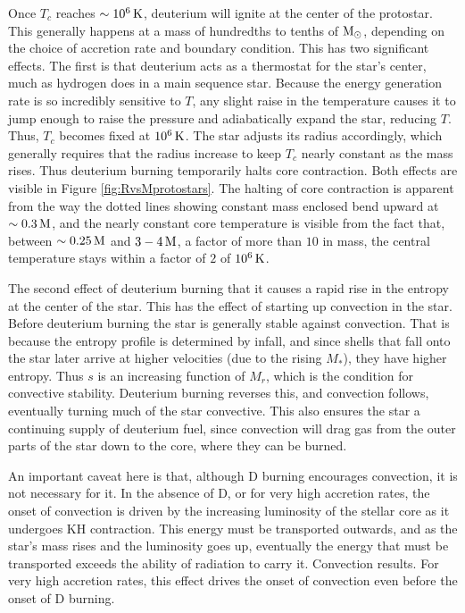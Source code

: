 \documentclass[a4paper,10pt]{article}
\begin{document}
{\noindent}Once $T_c$ reaches $\sim10^6\,{\rm K}$, deuterium will ignite at the center of the protostar. This generally happens at a mass of hundredths to tenths of ${\rm M_\odot}$, depending on the choice of accretion rate and boundary condition. This has two significant effects. The first is that deuterium acts as a thermostat for the star's center, much as hydrogen does
in a main sequence star. Because the energy generation rate is so incredibly sensitive to $T$, any slight raise in the temperature causes it to jump enough to raise the pressure and adiabatically expand the star, reducing $T$. Thus, $T_c$ becomes fixed at $10^6\,{\rm K}$. The star adjusts its radius accordingly, which generally requires that the radius increase to keep $T_c$ nearly constant as the mass rises. Thus deuterium burning temporarily halts core contraction. Both effects are visible in Figure \ref{fig:RvsMprotostars}. The halting of core contraction is apparent from the way the dotted lines showing constant mass enclosed bend upward at $\sim0.3\,{\rm M}$, and the nearly constant core temperature is visible from the fact that, between
$\sim0.25\,{\rm M}$ and $3-4\,{\rm M}$, a factor of more than $10$ in mass, the central temperature stays within a factor of $2$ of $10^6\,{\rm K}$.

{\noindent}The second effect of deuterium burning that it causes a rapid rise in the entropy at the center of the star. This has the effect of starting up convection in the star. Before deuterium burning the star is generally stable against convection. That is because the entropy profile is determined by infall, and since shells that fall onto the star later arrive at higher velocities (due to the rising $M_*$), they have higher entropy. Thus $s$ is an increasing function of $M_r$, which is the condition for convective stability. Deuterium burning reverses this, and convection follows, eventually turning much of the star convective. This also ensures the star a continuing supply of deuterium fuel, since convection will drag gas from the outer parts of the star down to the core, where they can be burned.

{\noindent}An important caveat here is that, although D burning encourages convection, it is not necessary for it. In the absence of D, or for very high accretion rates, the onset of convection is driven by the increasing luminosity of the stellar core as it undergoes KH contraction. This energy must be transported outwards, and as the star's mass rises and the luminosity goes up, eventually the energy that must be transported exceeds the ability of radiation to carry it. Convection results. For very high accretion rates, this effect drives the onset of convection even before the onset of D burning.
\end{document}
